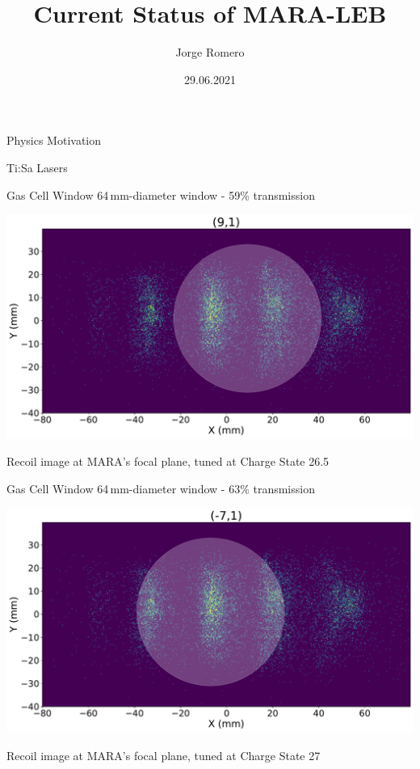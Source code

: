 \documentclass{beamer}
\title{Current Status of MARA-LEB}
\date{29.06.2021}
\author[auth]{Jorge Romero}
\begin{document}
\begin{frame}
\titlepage
\end{frame}
\begin{frame}{Physics Motivation}
    
\end{frame}
\begin{frame}{Ti:Sa Lasers}
    
\end{frame}
\begin{frame}{Gas Cell Window}
    \centering
    \vspace*{3em}
    64\,mm-diameter window - 59\% transmission

    \includegraphics[width=\textwidth]{Window2states.pdf} 
    
    Recoil image at MARA's focal plane, tuned at Charge State 26.5
\end{frame}
\begin{frame}{Gas Cell Window}
    \centering
    \vspace*{3em}
    64\,mm-diameter window - 63\% transmission  

    \includegraphics[width=\textwidth]{Window3states.pdf} 
    
    Recoil image at MARA's focal plane, tuned at Charge State 27
\end{frame}
\end{document}
